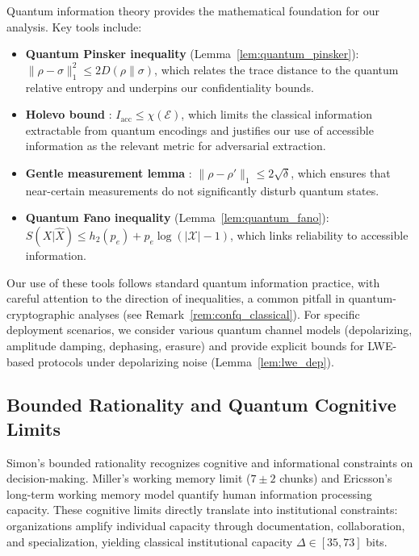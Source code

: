 \documentclass{ieeeaccess}
\begin{document}
Quantum information theory \cite{Wilde2017, NielsenChuang2010} provides the mathematical foundation for our analysis. Key tools include:

\begin{itemize}
    \item \textbf{Quantum Pinsker inequality} (Lemma~\ref{lem:quantum_pinsker}): $\|\rho - \sigma\|_1^2 \leq 2 D(\rho\|\sigma)$, which relates the trace distance to the quantum relative entropy and underpins our confidentiality bounds.
    
    \item \textbf{Holevo bound} \cite{Holevo1973}: $I_{\mathrm{acc}} \leq χ(\mathcal{E})$, which limits the classical information extractable from quantum encodings and justifies our use of accessible information as the relevant metric for adversarial extraction.
    
    \item \textbf{Gentle measurement lemma} \cite{Winter1999}: $\|\rho - \rho'\|_1 \leq 2\sqrt{\delta}$, which ensures that near-certain measurements do not significantly disturb quantum states.
    
    \item \textbf{Quantum Fano inequality} (Lemma~\ref{lem:quantum_fano}): $S(X|\hat{X}) \leq h_2(p_e) + p_e \log(|\mathcal{X}| - 1)$, which links reliability to accessible information.
\end{itemize}

Our use of these tools follows standard quantum information practice, with careful attention to the direction of inequalities, a common pitfall in quantum-cryptographic analyses (see Remark~\ref{rem:confq_classical}). For specific deployment scenarios, we consider various quantum channel models (depolarizing, amplitude damping, dephasing, erasure) and provide explicit bounds for LWE-based protocols under depolarizing noise (Lemma~\ref{lem:lwe_dep}).

\subsection{Bounded Rationality and Quantum Cognitive Limits}

Simon's bounded rationality \cite{Simon1957} recognizes cognitive and informational constraints on decision-making. Miller's working memory limit ($7 \pm 2$ chunks) \cite{Miller1956} and Ericsson's long-term working memory model \cite{Ericsson1995} quantify human information processing capacity. These cognitive limits directly translate into institutional constraints: organizations amplify individual capacity through documentation, collaboration, and specialization, yielding classical institutional capacity $\Delta \in [35, 73]$ bits.
\end{document}
